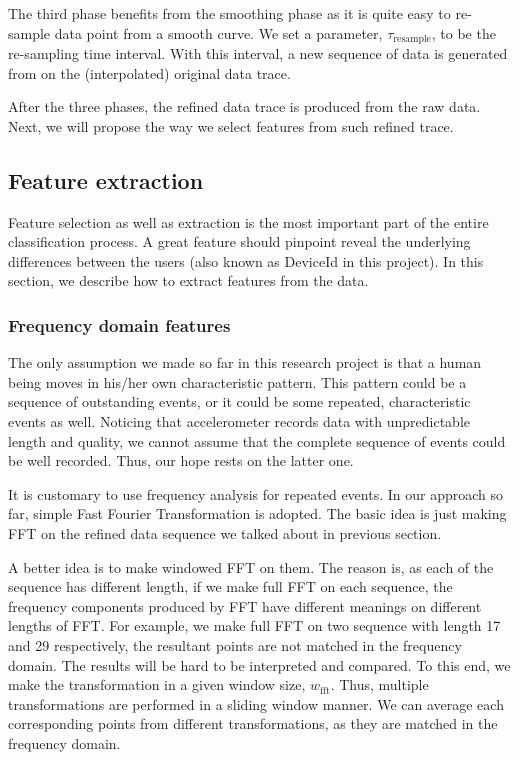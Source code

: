 \documentclass{article} %
\begin{document}
The third phase benefits from the smoothing phase as it is quite easy to re-sample data point from a smooth curve. We set a parameter, $\tau_\mathrm{resample}$, to be the re-sampling time interval. With this interval, a new sequence of data is generated from on the (interpolated) original data trace.

After the three phases, the refined data trace is produced from the raw data. Next, we will propose the way we select features from such refined trace.

\subsection{Feature extraction}
Feature selection as well as extraction is the most important part of the entire classification process. A great feature should pinpoint reveal the underlying differences between the users (also known as DeviceId in this project). In this section, we describe how to extract features from the data.
	
\subsubsection{Frequency domain features}
The only assumption we made so far in this research project is that a human being moves in his/her own characteristic pattern. This pattern could be a sequence of outstanding events, or it could be some repeated, characteristic events as well. Noticing that accelerometer records data with unpredictable length and quality, we cannot assume that the complete sequence of events could be well recorded. Thus, our hope rests on the latter one. 

It is customary to use frequency analysis for repeated events. In our approach so far, simple Fast Fourier Transformation is adopted. The basic idea is just making FFT on the refined data sequence we talked about in previous section.

A better idea is to make windowed FFT on them. The reason is, as each of the sequence has different length, if we make full FFT on each sequence, the frequency components produced by FFT have different meanings on different lengths of FFT. For example, we make full FFT on two sequence with length 17 and 29 respectively, the resultant points are not matched in the frequency domain. The results will be hard to be interpreted and compared. To this end, we make the transformation in a given window size, $w_\mathrm{fft}$. Thus, multiple transformations are performed in a sliding window manner. We can average each corresponding points from different transformations, as they are matched in the frequency domain. 
\end{document}
